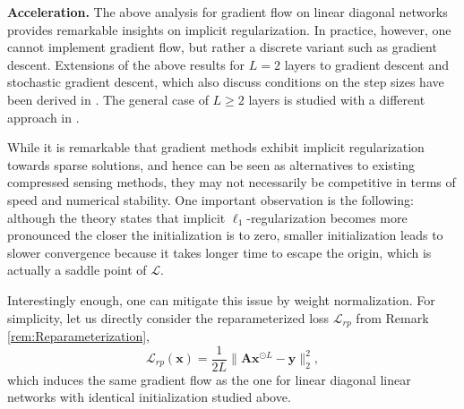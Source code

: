 \documentclass{svproc}
\newcommand{\bA}{\boldsymbol{A}}
\newcommand{\bx}{\boldsymbol{x}}
\newcommand{\by}{\boldsymbol{y}}
\newcommand{\0}{\boldsymbol{0}}
\newcommand{\1}{\boldsymbol{1}}
\renewcommand{\epsilon}{\varepsilon}
\def\Ldln{\mathcal{L}_\text{dln}}
\begin{document}
\textbf{Acceleration.} The above analysis for gradient flow on linear diagonal networks provides remarkable insights on implicit regularization. In practice, however, one cannot implement gradient flow, but rather a discrete variant such as gradient descent. 
Extensions of the above results for $L = 2$ layers to gradient descent and stochastic gradient descent, which also discuss conditions on the step sizes have been derived in \cite{even2023s}. The general case of $L\geq 2$ layers is studied with a different approach in \cite{bara26}.

\medskip

While it is remarkable that gradient methods exhibit implicit regularization towards sparse solutions, and hence can be seen as alternatives to existing compressed sensing methods, they may not necessarily be competitive in terms of speed and numerical stability.
One important observation is the following: although the theory states that implicit $\ell_1$-regularization becomes more pronounced the closer the initialization is to zero, smaller initialization leads to slower convergence because it takes longer time to escape the origin, which is actually a saddle point of $\mathcal{L}$.

Interestingly enough, one can mitigate this issue by weight normalization. For simplicity, let us directly consider the reparameterized loss $\mathcal L_{rp}$ from Remark \ref{rem:Reparameterization},
\begin{equation}\label{eq:factorized_loss}
    \mathcal{L}_{rp} (\bx) = \frac{1}{2L}\|\bA\bx^{\odot L} - \by\|_2^2,
\end{equation}
which induces the same gradient flow as the one for linear diagonal linear networks %
with identical initialization studied above. 
\end{document}
